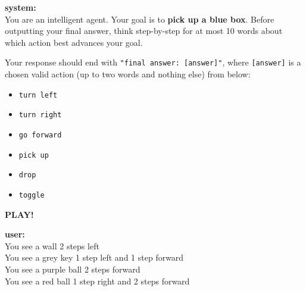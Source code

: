 \documentclass[11pt,a4paper]{article}
\begin{document}
\begin{tcolorbox}[
  enhanced,
  title={Without hiding the content of invalid actions from the context},
  fonttitle=\bfseries,
  colback=white,
  colframe=black!70,
  boxrule=1pt,
  arc=3pt,
  outer arc=3pt,
  top=4pt,
  bottom=4pt,
  left=6pt,
  right=6pt,
  boxsep=4pt
]

  \begin{tcolorbox}[
    enhanced,
    colback=gray!10,
    colframe=black!80,
    boxrule=0.5pt,
    arc=2pt,
    outer arc=2pt,
    top=2pt,
    bottom=2pt,
    left=4pt,
    right=4pt,
    boxsep=2pt
  ]
    \textbf{system:}\\[4pt]
    You are an intelligent agent. Your goal is to \textbf{pick up a blue box}. 
    Before outputting your final answer, think step-by-step for at most 10 words 
    about which action best advances your goal.

    Your response should end with \texttt{"final answer: [answer]"}, where \texttt{[answer]} 
    is a chosen valid action (up to two words and nothing else) from below:

    \begin{itemize}[leftmargin=1.5em, itemsep=0pt, parsep=0pt, topsep=2pt]
      \item \texttt{turn left}
      \item \texttt{turn right}
      \item \texttt{go forward}
      \item \texttt{pick up}
      \item \texttt{drop}
      \item \texttt{toggle}
    \end{itemize}

    \textbf{PLAY!}
  \end{tcolorbox}

  \begin{tcolorbox}[
    enhanced,
    colback=green!5,
    colframe=green!50!black,
    boxrule=0.5pt,
    arc=2pt,
    outer arc=2pt,
    top=2pt,
    bottom=2pt,
    left=4pt,
    right=4pt,
    boxsep=2pt
  ]
    \textbf{user:}\\[4pt]
    You see a wall 2 steps left \\
    You see a grey key 1 step left and 1 step forward \\
    You see a purple ball 2 steps forward \\
    You see a red ball 1 step right and 2 steps forward
  \end{tcolorbox}


\end{tcolorbox}
\end{document}
